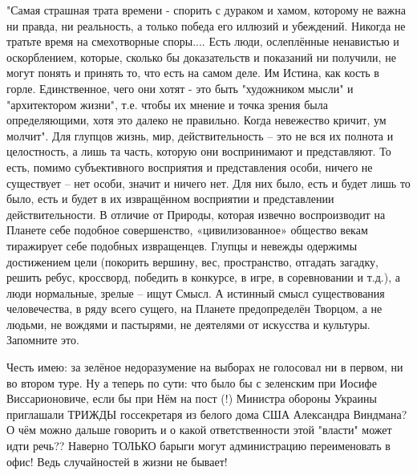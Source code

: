 \begin{itemize}
"Самая страшная трата времени - спорить с дураком и хамом, которому не важна ни
правда, ни реальность, а только победа его иллюзий и убеждений. Никогда не
тратьте время на смехотворные споры.... Есть люди, ослеплённые ненавистью и
оскорблением, которые, сколько бы доказательств и показаний ни получили, не
могут понять и принять то, что есть на самом деле. Им Истина, как кость в
горле. Единственное, чего они хотят - это быть "художником мысли" и
"архитектором жизни", т.е. чтобы их мнение и точка зрения была определяющими,
хотя это далеко не правильно. Когда невежество кричит, ум молчит". Для глупцов
жизнь, мир, действительность – это не вся их полнота и целостность, а лишь та
часть, которую они воспринимают и представляют. То есть, помимо субъективного
восприятия и представления особи, ничего не существует – нет особи, значит и
ничего нет. Для них было, есть и будет лишь то было, есть и будет в их
извращённом восприятии и представлении действительности. В отличие от Природы,
которая извечно воспроизводит на Планете себе подобное совершенство,
«цивилизованное» общество векам тиражирует себе подобных извращенцев. Глупцы и
невежды одержимы достижением цели (покорить вершину, вес, пространство,
отгадать загадку, решить ребус, кроссворд, победить в конкурсе, в игре, в
соревновании и т.д.), а люди нормальные, зрелые -- ищут Смысл. А истинный смысл
существования человечества, в ряду всего сущего, на Планете предопределён
Творцом, а не людьми, не вождями и пастырями, не деятелями от искусства и
культуры. Запомните это.


 

Честь имею: за зелёное недоразумение на выборах не голосовал ни в первом, ни во
втором туре. Ну а теперь по сути: что было бы с зеленским при Иосифе
Виссарионовиче, если бы при Нём на пост (!) Министра обороны Украины приглашали
ТРИЖДЫ госсекретаря из белого дома США Александра Виндмана? О чём можно дальше
говорить и о какой ответственности этой "власти" может идти речь?? Наверно
ТОЛЬКО барыги могут администрацию переименовать в офис! Ведь случайностей в
жизни не бывает!


 


\end{itemize}

